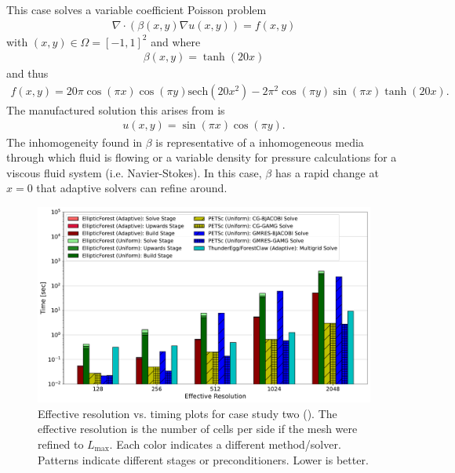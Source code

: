 This case solves a variable coefficient Poisson problem
\begin{align}
    \nabla \cdot \left( \beta(x,y) \nabla u(x,y) \right) = f(x,y)
\end{align}
with $(x,y) \in \Omega = [-1,1]^2$ and where
\begin{align}
    \beta(x,y) = \tanh(20 x)
\end{align}
and thus
\begin{align}
    f(x,y) = 20 \pi \cos(\pi x) \cos(\pi y) \text{sech}(20 x^2) - 2 \pi^2 \cos(\pi y) \sin(\pi x) \tanh(20 x).
\end{align}
The manufactured solution this arises from is
\begin{align}
    u(x,y) = \sin(\pi x) \cos(\pi y).
\end{align}
The inhomogeneity found in $\beta$ is representative of a inhomogeneous media through which fluid is flowing or a variable density for pressure calculations for a viscous fluid system (i.e. Navier-Stokes). In this case, $\beta$ has a rapid change at $x = 0$ that adaptive solvers can refine around.

    \begin{figure}
        \centering
        \includegraphics[width=1.0\textwidth, clip=true, trim={0 0 0 0}]{figures/case02-stacked-bar-plot-comparisons-no-title.pdf}
        \caption{Effective resolution vs. timing plots for case study two (). The effective resolution is the number of cells per side if the mesh were refined to $L_{\text{max}}$. Each color indicates a different method/solver. Patterns indicate different stages or preconditioners. Lower is better.}
        \label{fig:case02-stacked-bar-plot}
    \end{figure}

